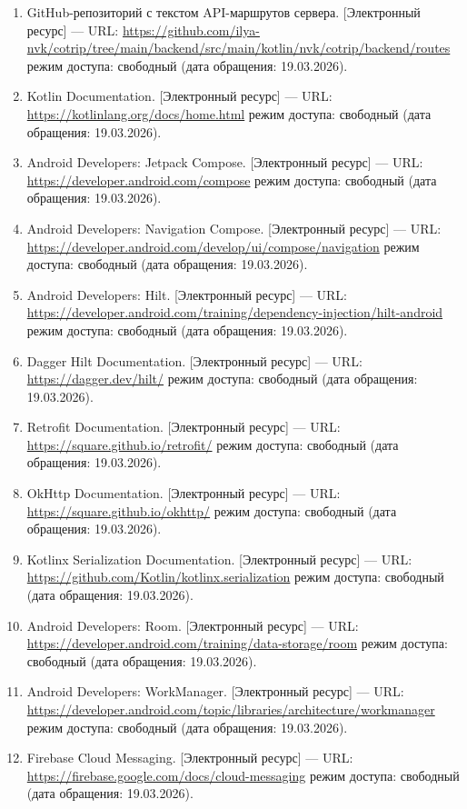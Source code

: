 \documentclass[12pt,a4paper]{article}
\begin{document}
\begin{enumerate}
  \item GitHub-репозиторий с текстом API-маршрутов сервера. [Электронный ресурс] --- URL: \url{https://github.com/ilya-nvk/cotrip/tree/main/backend/src/main/kotlin/nvk/cotrip/backend/routes} режим доступа: свободный (дата обращения: 19.03.2026).
  \item Kotlin Documentation. [Электронный ресурс] --- URL: \url{https://kotlinlang.org/docs/home.html} режим доступа: свободный (дата обращения: 19.03.2026).
  \item Android Developers: Jetpack Compose. [Электронный ресурс] --- URL: \url{https://developer.android.com/compose} режим доступа: свободный (дата обращения: 19.03.2026).
  \item Android Developers: Navigation Compose. [Электронный ресурс] --- URL: \url{https://developer.android.com/develop/ui/compose/navigation} режим доступа: свободный (дата обращения: 19.03.2026).
  \item Android Developers: Hilt. [Электронный ресурс] --- URL: \url{https://developer.android.com/training/dependency-injection/hilt-android} режим доступа: свободный (дата обращения: 19.03.2026).
  \item Dagger Hilt Documentation. [Электронный ресурс] --- URL: \url{https://dagger.dev/hilt/} режим доступа: свободный (дата обращения: 19.03.2026).
  \item Retrofit Documentation. [Электронный ресурс] --- URL: \url{https://square.github.io/retrofit/} режим доступа: свободный (дата обращения: 19.03.2026).
  \item OkHttp Documentation. [Электронный ресурс] --- URL: \url{https://square.github.io/okhttp/} режим доступа: свободный (дата обращения: 19.03.2026).
  \item Kotlinx Serialization Documentation. [Электронный ресурс] --- URL: \url{https://github.com/Kotlin/kotlinx.serialization} режим доступа: свободный (дата обращения: 19.03.2026).
  \item Android Developers: Room. [Электронный ресурс] --- URL: \url{https://developer.android.com/training/data-storage/room} режим доступа: свободный (дата обращения: 19.03.2026).
  \item Android Developers: WorkManager. [Электронный ресурс] --- URL: \url{https://developer.android.com/topic/libraries/architecture/workmanager} режим доступа: свободный (дата обращения: 19.03.2026).
  \item Firebase Cloud Messaging. [Электронный ресурс] --- URL: \url{https://firebase.google.com/docs/cloud-messaging} режим доступа: свободный (дата обращения: 19.03.2026).

\end{enumerate}
\end{document}
